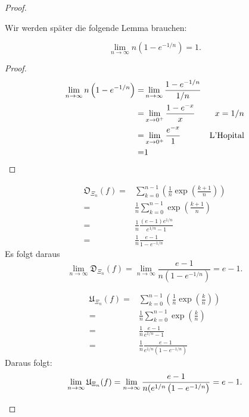 \begin{proof}\noindent 
	\begin{tcolorbox}[breakable]
		Wir werden später die folgende Lemma brauchen:
	\begin{Lemma}
		\[\lim_{n \to \infty} n\left( 1-e^{- 1 / n} \right) =1.\]
	\end{Lemma}
		\begin{proof}
			\begin{align*}
				\lim_{n \to \infty} n\left( 1-e^{-1 / n} \right) =&\lim_{n \to \infty} \frac{1 - e^{-1 / n}}{1 / n}\\
				=&\lim_{x \to 0^+} \frac{1-e^{-x}}{x} & x= 1 / n\\
				=&\lim_{x \to 0^+} \frac{e^{-x}}{1}&\text{L'Hopital}\\
				=&1\qedhere
			\end{align*}
		\end{proof}
	\end{tcolorbox}
	\begin{parts}
	\item 
\begin{align*}
	\mathfrak{O}_{\Xi_n}(f)=&\sum_{k=0}^{n-1} \left( \frac{1}{n}\exp\left( \frac{k+1}{n} \right)  \right)\\ 
	=&\frac{1}{n}\sum_{k=0}^{n-1} \exp\left( \frac{k+1}{n} \right)\\
	=& \frac{1}{n}\frac{(e-1)e^{1 / n}}{e^{1 / n}-1}\\
	=&\frac{1}{n}\frac{e-1}{1-e^{-1 / n}} 
\end{align*}
Es folgt daraus
\[
	\lim_{n \to \infty} \mathfrak{D}_{\Xi_n}(f)=\lim_{n \to \infty} \frac{e-1}{n\left( 1-e^{-1 / n} \right) }=e-1
.\] 
\item 
	\begin{align*}
		\mathfrak{U}_{\Xi_n}(f)=&\sum_{k=0}^{n-1} \left( \frac{1}{n}\exp\left( \frac{k}{n} \right)  \right) \\
		=&\frac{1}{n}\sum_{k=0}^{n-1} \exp\left( \frac{k}{n} \right)\\
		=&\frac{1}{n}\frac{e-1}{e^{1 / n}-1}\\
		=&\frac{1}{n}\frac{e-1}{e^{1 / n}\left( 1-e^{- 1 / n} \right) }
	\end{align*}
	Daraus folgt:
	\[
		\lim_{n \to \infty} \mathfrak{U}_{\Xi_n}(f)=\lim_{n \to \infty} \frac{e-1}{n(e^{1 / n}\left( 1-e^{-1 / n} \right) }=e-1
	.\qedhere\] 
	\end{parts}
\end{proof}
